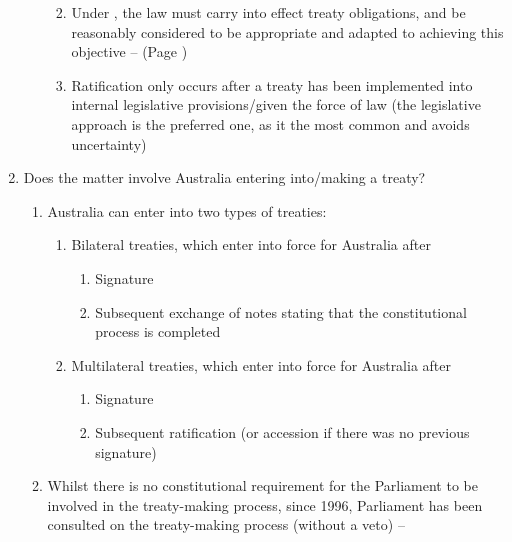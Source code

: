 \begin{enumerate}
\begin{enumerate}
\begin{enumerate}
\begin{enumerate}
            \end{enumerate}
            \item Under , the law must carry into effect treaty obligations, and be reasonably considered to be appropriate and adapted to achieving this objective --  (Page \pageref{case:Commonwealth v Tasmania})
            \item Ratification only occurs after a treaty has been implemented into internal legislative provisions/given the force of law (the legislative approach is the preferred one, as it the most common and avoids uncertainty)
        \end{enumerate}
    \end{enumerate}
    \item Does the matter involve Australia entering into/making a treaty?
    \begin{enumerate}
        \item Australia can enter into two types of treaties:
        \begin{enumerate}
            \item Bilateral treaties, which enter into force for Australia after
            \begin{enumerate}
                \item Signature
                \item Subsequent exchange of notes stating that the constitutional process is completed
            \end{enumerate}
            \item Multilateral treaties, which enter into force for Australia after
            \begin{enumerate}
                \item Signature
                \item Subsequent ratification (or accession if there was no previous signature)
            \end{enumerate}
        \end{enumerate}
        \item \label{item:trick or treaty} Whilst there is no constitutional requirement for the Parliament to be involved in the treaty-making process, since 1996, Parliament has been consulted on the treaty-making process (without a veto) -- 
        \begin{enumerate}

\end{enumerate}
\end{enumerate}
\end{enumerate}
